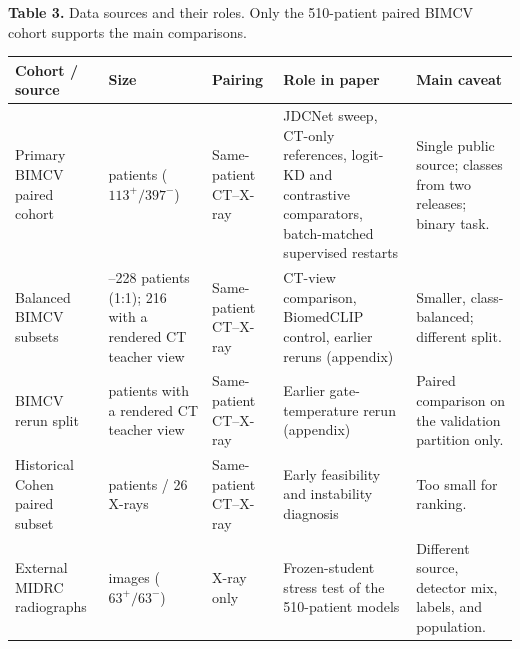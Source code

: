\documentclass[pdflatex,sn-vancouver,Numbered]{sn-jnl}
\begin{document}
\begin{minipage}{\textwidth}
{\small\noindent\textbf{Table 3.} Data sources and their roles. Only the 510-patient paired BIMCV cohort supports the main comparisons.\par}
\vspace{6pt}


\centering
\footnotesize
\setlength{\tabcolsep}{4pt}
\renewcommand{\arraystretch}{0.95}
\begin{tabularx}{\textwidth}{|>{\raggedright\arraybackslash}p{}|>{\raggedright\arraybackslash}p{}|>{\raggedright\arraybackslash}p{}|>{\raggedright\arraybackslash}p{}|>{\raggedright\arraybackslash}X|}
\hline
Cohort / source & Size & Pairing & Role in paper & Main caveat \\ \hline
Primary BIMCV paired cohort & 510 patients ($113^+ / 397^-$) & Same-patient CT--X-ray & JDCNet sweep, CT-only references, logit-KD and contrastive comparators, batch-matched supervised restarts & Single public source; classes from two releases; binary task. \\ \hline
Balanced BIMCV subsets & 226--228 patients (1:1); 216 with a rendered CT teacher view & Same-patient CT--X-ray & CT-view comparison, BiomedCLIP control, earlier reruns (appendix) & Smaller, class-balanced; different split. \\ \hline
BIMCV rerun split & 466 patients with a rendered CT teacher view & Same-patient CT--X-ray & Earlier gate-temperature rerun (appendix) & Paired comparison on the validation partition only. \\ \hline
Historical Cohen paired subset & 19 patients / 26 X-rays & Same-patient CT--X-ray & Early feasibility and instability diagnosis & Too small for ranking. \\ \hline
External MIDRC radiographs & 126 images ($63^+/63^-$) & X-ray only & Frozen-student stress test of the 510-patient models & Different source, detector mix, labels, and population. \\ \hline
\end{tabularx}
\end{minipage}
\clearpage
\end{document}
